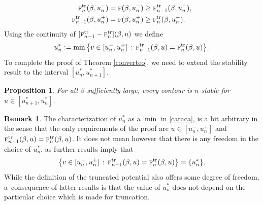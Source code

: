 \documentclass[10pt]{amsart}
\newcommand{\sep}{\,:\,}
\numberwithin{equation}{section}
\theoremstyle{plain}
\newtheorem{proposition}[theorem]{Proposition}
\theoremstyle{definition}
\newtheorem{rem}[theorem]{Remark}
\newcommand{\gb}{\beta}
\newcommand{\tr}{\mathrm{tr}}
\newcommand{\tf}{\textsc{f}}
\begin{document}
\begin{equation*}\begin{split}
\tf^{\tr}_{n}(\gb,u^-_n)&=\tf(\gb,u^-_n)\ge \tf^{\tr}_{n-1}(\gb,u^-_n),\\
\tf^{\tr}_{n-1}(\gb,u^+_n)&=\tf(\gb,u^+_n)\ge \tf^{\tr}_{n}(\gb,u^+_n).
\end{split}\end{equation*}
Using the continuity of $[\tf^{\tr}_{n-1}-\tf^{\tr}_{n}](\gb,u)$ we define
\begin{equation}\label{caraca}
u^*_n:=\min\left\{v\in [u^-_n,u^+_n] \sep \tf^{\tr}_{n-1}(\gb,u)=\tf^{\tr}_{n}(\gb,u) \right\}.
\end{equation}
To complete the proof of Theorem \ref{converteo}, we need to extend the stability result to the interval $[u^*_n,u^*_{n+1}]$.
\begin{proposition}\label{mejor}
For all $\gb$ sufficiently large,
every contour is $n$-stable for $u\in[u^*_{n+1},u^*_n]$.
\end{proposition}

\begin{rem}
The characterization of $u^*_n$ as a $\min$ in \eqref{caraca}, is a bit arbitrary in the sense that the only requirements of the proof are $u\in [u^-_n,u^+_n]$ and
$\tf^{\tr}_{n-1}(\gb,u)=\tf^{\tr}_{n}(\gb,u)$. It does not mean however that there is any freedom in the choice of $u^*_n$,
as further results imply that
\begin{equation*}%
\left\{v\in [u^-_n,u^+_n] \sep \tf^{\tr}_{n-1}(\gb,u)=\tf^{\tr}_{n}(\gb,u) \right\}=\{u^*_n\}.
\end{equation*}
While the definition of the truncated potential also offers some degree of freedom, a~consequence of latter results is that the value of $u^*_n$ does not depend on the particular choice which is made for truncation.
\end{rem}
\end{document}
